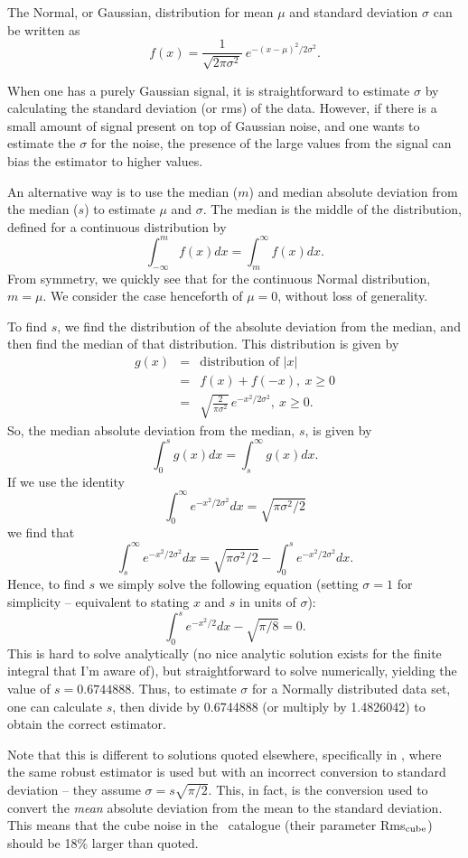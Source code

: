 \label{app-madfm}

The Normal, or Gaussian, distribution for mean $\mu$ and standard
deviation $\sigma$ can be written as 
\[ 
f(x) = \frac{1}{\sqrt{2\pi\sigma^2}}\ e^{-(x-\mu)^2/2\sigma^2}.
 \]

When one has a purely Gaussian signal, it is straightforward to
estimate $\sigma$ by calculating the standard deviation (or rms) of
the data. However, if there is a small amount of signal present on top
of Gaussian noise, and one wants to estimate the $\sigma$ for the
noise, the presence of the large values from the signal can bias the
estimator to higher values.

An alternative way is to use the median ($m$) and median absolute
deviation from the median ($s$) to estimate $\mu$ and $\sigma$. The
median is the middle of the distribution, defined for a continuous
distribution by
\[
\int_{-\infty}^{m} f(x) dx = \int_{m}^{\infty} f(x) dx.
\]
From symmetry, we quickly see that for the continuous Normal
distribution, $m=\mu$. We consider the case henceforth of $\mu=0$,
without loss of generality.

To find $s$, we find the distribution of the absolute deviation from
the median, and then find the median of that distribution. This
distribution is given by
\begin{eqnarray*}
g(x) &= &{\text{distribution of }} |x|\\
     &= &f(x) + f(-x),\ x\ge0\\
     &= &\sqrt{\frac{2}{\pi\sigma^2}}\, e^{-x^2/2\sigma^2},\ x\ge0.
\end{eqnarray*}
So, the median absolute deviation from the median, $s$, is given by
\[
\int_{0}^{s} g(x) dx = \int_{s}^{\infty} g(x) dx.
\]
If we use the identity
\[
\int_{0}^{\infty}e^{-x^2/2\sigma^2} dx = \sqrt{\pi\sigma^2/2}
\] 
we find that 
\[
\int_{s}^{\infty} e^{-x^2/2\sigma^2} dx =
\sqrt{\pi\sigma^2/2}-\int_{0}^{s} e^{-x^2/2\sigma^2}dx.
\]
Hence, to find $s$ we simply solve the following equation (setting
$\sigma=1$ for simplicity -- equivalent to stating $x$ and $s$ in
units of $\sigma$):
\[
\int_{0}^{s}e^{-x^2/2} dx - \sqrt{\pi/8} = 0.
\]
This is hard to solve analytically (no nice analytic solution exists
for the finite integral that I'm aware of), but straightforward to
solve numerically, yielding the value of $s=0.6744888$. Thus, to
estimate $\sigma$ for a Normally distributed data set, one can
calculate $s$, then divide by 0.6744888 (or multiply by 1.4826042) to
obtain the correct estimator.

Note that this is different to solutions quoted elsewhere,
specifically in \citet{meyer04:trunc}, where the same robust estimator
is used but with an incorrect conversion to standard deviation -- they
assume $\sigma = s\sqrt{\pi/2}$. This, in fact, is the conversion used
to convert the \emph{mean} absolute deviation from the mean to the
standard deviation. This means that the cube noise in the \hipass\
catalogue (their parameter Rms$_{\rm cube}$) should be 18\% larger
than quoted.
